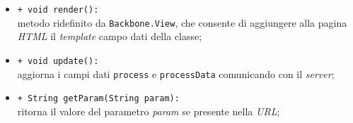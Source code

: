 \begin{flushleft}
\begin{itemize}
\begin{sloppypar}
\begin{itemize}
\item \texttt{+ void render():}\\ metodo ridefinito da \texttt{Backbone.View}, che consente di aggiungere alla pagina \textit{HTML} il \textit{template} campo dati della classe;
\item \texttt{+ void update():}\\ aggiorna i campi dati \texttt{process} e \texttt{processData} comunicando con il \textit{server};
\item \texttt{+ String getParam(String param):}\\ ritorna il valore del parametro \textit{param} se presente nella \textit{URL};
\end{itemize}
\end{sloppypar}
\end{itemize}
\end{flushleft}

